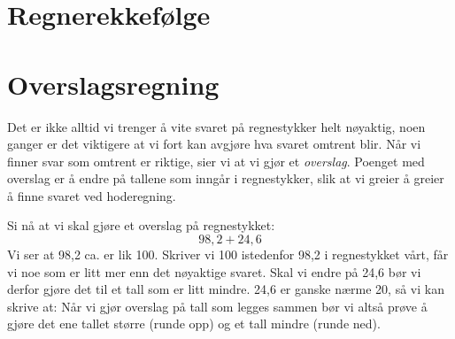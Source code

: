 \section{Regnerekkefølge}
\section{Overslagsregning}
Det er ikke alltid vi trenger å vite svaret på regnestykker helt nøyaktig, noen ganger er det viktigere at vi fort kan avgjøre hva svaret omtrent blir. Når vi finner svar som omtrent er riktige, sier vi at vi gjør et \textit{overslag}. Poenget med overslag er å endre på tallene som inngår i regnestykker, slik at vi greier å greier å finne svaret ved hoderegning.\vsk

Si nå at vi skal gjøre et overslag på regnestykket:
\[ 98,2+24,6 \]
Vi ser at 98,2 ca. er lik 100. Skriver vi 100 istedenfor 98,2 i regnestykket vårt, får vi noe som er litt mer enn det nøyaktige svaret. Skal vi endre på 24,6 bør vi derfor gjøre det til et tall som er litt mindre. 24,6 er ganske nærme 20, så vi kan skrive at:
Når vi gjør overslag på tall som legges sammen bør vi altså prøve å gjøre det ene tallet større (runde opp) og et tall mindre (runde ned).\vsk

